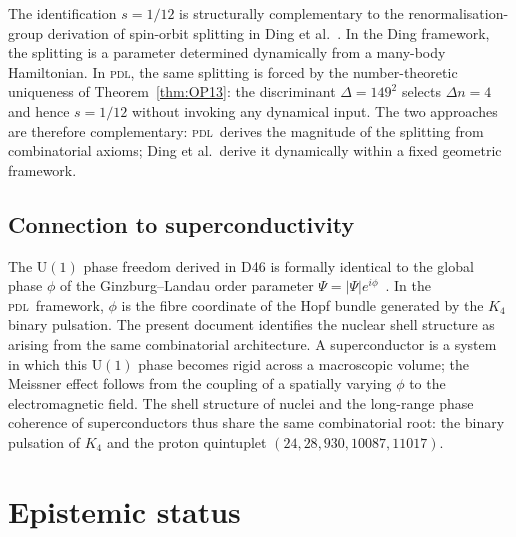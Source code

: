 \documentclass[12pt,a4paper]{article}
\newcommand{\PDL}{\textsc{pdl}}
\newcommand{\quintuplet}{(24,28,930,10087,11017)}
\newcommand{\Dn}{\Delta n}
\begin{document}
The identification $s = 1/12$ is structurally complementary to the renormalisation-group derivation of spin-orbit splitting in Ding et al.~\cite{Ding_PRL_2026}. In the Ding framework, the splitting is a parameter determined dynamically from a many-body Hamiltonian. In \PDL, the same splitting is forced by the number-theoretic uniqueness of Theorem~\ref{thm:OP13}: the discriminant $\Delta = 149^2$ selects $\Dn = 4$ and hence $s = 1/12$ without invoking any dynamical input. The two approaches are therefore complementary: \PDL\ derives the magnitude of the splitting from combinatorial axioms; Ding et al.\ derive it dynamically within a fixed geometric framework.

\subsection{Connection to superconductivity}

The $\mathrm{U}(1)$ phase freedom derived in D46 is formally identical to the global phase $\phi$ of the Ginzburg--Landau order parameter $\Psi = |\Psi|e^{i\phi}$~\cite{Ginzburg_1950}. In the \PDL\ framework, $\phi$ is the fibre coordinate of the Hopf bundle generated by the $K_4$ binary pulsation. The present document identifies the nuclear shell structure as arising from the same combinatorial architecture. A superconductor is a system in which this $\mathrm{U}(1)$ phase becomes rigid across a macroscopic volume; the Meissner effect follows from the coupling of a spatially varying $\phi$ to the electromagnetic field. The shell structure of nuclei and the long-range phase coherence of superconductors thus share the same combinatorial root: the binary pulsation of $K_4$ and the proton quintuplet $\quintuplet$.

\section{Epistemic status}
\label{sec:epistemic}
\end{document}
